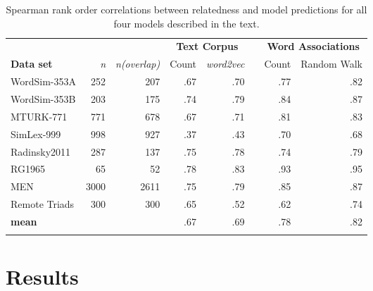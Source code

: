 \documentclass{article}
\begin{document}
\begin{table*}[t]
\centering
\caption{Spearman rank order correlations between relatedness and model predictions for all four models described in the text. }
\vspace{-0.15cm}
\label{Table:basicCorrelations}
\begin{tabular}{@{}lrrrrrrr@{}}
\toprule
&            & \multicolumn{1}{l}{} & \multicolumn{2}{c}{\textbf{Text Corpus}}
			 & \multicolumn{1}{l}{} & \multicolumn{2}{c}{\textbf{Word Associations}} \\
\cmidrule(lr){4-5} \cmidrule(l){7-8}
\textbf{Data set} 	   &  \textit{n}     & \textit{n(overlap)}   & Count
					   & {\it word2vec}   &   & Count    & Random Walk
\\ \midrule
WordSim-353A           &  252   & 207     &  .67   & .70    &    & .77   & .82    \\
WordSim-353B 		   &  203   & 175     &  .74   & .79    &    & .84   & .87    \\
MTURK-771              &  771   & 678     &  .67   & .71    &    & .81   & .83    \\
SimLex-999             &  998   & 927     &  .37   & .43    &    & .70   & .68    \\
Radinsky2011           &  287   & 137     &  .75   & .78    &    & .74   & .79    \\
RG1965                 &  65    & 52      &  .78   & .83    &    & .93   & .95    \\
MEN                    &  3000  & 2611    &  .75   & .79    &    & .85   & .87    \\
Remote Triads          &  300   & 300     &  .65   & .52    &    & .62   & .74    \\
\cmidrule(l){4-8}
\textbf{mean}          &    &             &  .67   & .69    &    & .78   & .82    \\
\bottomrule
\vspace{-0.742cm}
\end{tabular}
\end{table*}



\section{Results}
\label{sec:results}
\end{document}

